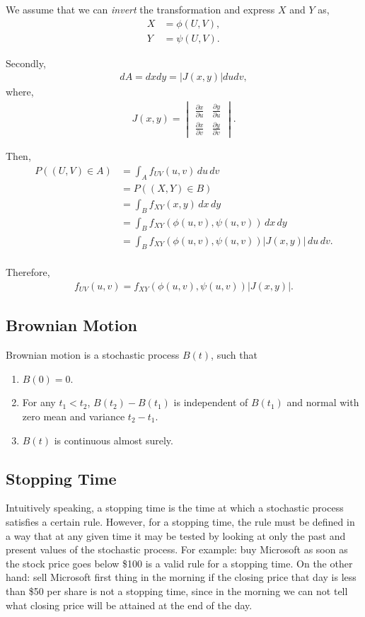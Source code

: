 \documentclass{amsart}
\theoremstyle{plain}
\numberwithin{equation}{section}
\begin{document}
We assume that we can \emph{invert} the transformation 
and express $X$ and $Y$ as,
\begin{align*}
X &= \phi(U, V),\\
Y &= \psi(U, V).
\end{align*}

Secondly,
\begin{align*}
dA = dx dy = \left|J(x, y)\right| du dv,
\end{align*}
where,
\begin{align*}
J(x, y) = 
\begin{vmatrix}
\frac{\partial x}{\partial u} & \frac{\partial y}{\partial u}\\
\frac{\partial x}{\partial v} & \frac{\partial y}{\partial v}
\end{vmatrix}.
\end{align*}

Then,
\begin{align*}
P((U,V) \in A) &= \int_{A} f_{UV}(u, v) \,du \,dv \\
&= P((X,Y) \in B)\\
&= \int_{B} f_{XY}(x, y) \,dx \,dy \\
&= \int_{B} f_{XY}(\phi(u,v), \psi(u,v)) \,dx \,dy \\
&= \int_{B} f_{XY}(\phi(u,v), \psi(u,v)) \left|J(x, y)\right|\,du \,dv.\\
\end{align*}

Therefore,
\begin{align*}
f_{UV}(u, v) = f_{XY}(\phi(u,v), \psi(u,v)) \left|J(x, y)\right|.
\end{align*}


\subsection*{Brownian Motion}
Brownian motion is a stochastic 
process $B(t)$, such that 
\begin{enumerate}
\item $B(0)=0$.
\item For any $t_1 < t_2$, $B(t_2)-B(t_1)$ is 
independent of $B(t_1)$ and normal with zero mean and 
variance $t_2-t_1$. 
\item $B(t)$ is continuous almost surely.
\end{enumerate}

\subsection*{Stopping Time}
Intuitively speaking, a stopping time 
is the time at which 
a stochastic process satisfies a 
certain rule. However, for a stopping time, the 
rule must be defined in a way that at any given time
it may be tested by looking at
only the past and present values of the 
stochastic process. 
For example: buy Microsoft as 
soon as the stock price goes below \$100 is a valid
rule for a stopping time. On the other hand: sell 
Microsoft first thing in the morning if the closing price
that day is less than \$50 per share
is not a stopping time, since in the morning we can not 
tell what closing price will be attained at the end of 
the day. 
\end{document}
